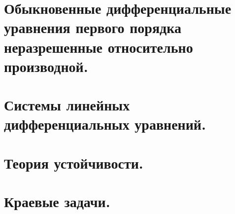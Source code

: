 \documentclass[fleqn, 12pt, a4paper, titlepage]{extarticle}
\begin{document}
		\section*{Обыкновенные дифференциальные уравнения первого порядка неразрешенные относительно производной.}
		

		
		\section*{Системы линейных дифференциальных уравнений.}
		

		
		\section*{Теория устойчивости.}
		

		
		\section*{Краевые задачи.}
		

		
\end{document}
